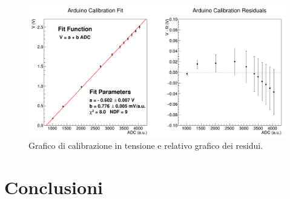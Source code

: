 \documentclass[a4paper,11pt]{article} %
\begin{document}
\begin{figure}[H]
	\centering
	\includegraphics[width=15cm]{../Arduino/Plots/calib_function.png}
	\caption{Grafico di calibrazione in tensione e relativo grafico dei residui.}
	\label{i:ar_calib}
\end{figure}

\noindent 



\section{Conclusioni}
\end{document}
